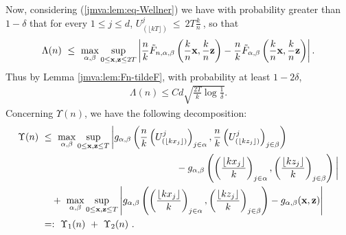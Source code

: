 Now, considering (\ref{jmva:lem:eq-Wellner}) we have with probability greater than $1-\delta$ that
for every $1\le j \le d$, $U_{(\lfloor kT\rfloor )}^j ~\le~ 2T \frac{k}{n}~$, so that
\begin{align*} 
\Lambda(n) %
  ~\le~ 
\max_{\alpha, \beta}  \sup_{0 \le \mb x, \mb z \le 2T} \left| \frac{n}{k} \tilde F_{n, \alpha, \beta} \left( \frac{k}{n} \mb x , \frac{k}{n} \mb z \right) - \frac{n}{k} \tilde F_{\alpha, \beta} \left( \frac{k}{n} \mb x , \frac{k}{n} \mb z \right)  \right|.
\end{align*}
\noindent
Thus by Lemma \ref{jmva:lem:Fn-tildeF}, with probability at least $1-2\delta$,
\begin{align*}
 \Lambda(n) \le C d\sqrt{\frac{2 T}{k}\log\frac{1}{\delta}}.
\end{align*}
\noindent
Concerning $\Upsilon(n)$, we have the following decomposition:
\begin{align*}
 \Upsilon(n) &~\le~ \max_{\alpha, \beta} \sup_{ 0 \le \mathbf x, \mathbf z \le T } \bigg| g_{\alpha, \beta} \left( \frac{n}{k} \left(U_{(\lfloor kx_j\rfloor)}^j\right)_{j \in \alpha} , \frac{n}{k}\left(U_{(\lfloor kz_j\rfloor)}^j\right)_{j \in \beta}  \right) 
\\&~~~~~~~~~~~~~~~~~~~~~~~~~~~~~~~~~~~~~~~~~~~- g_{\alpha, \beta} \left(  \left(\frac{\lfloor kx_j\rfloor }{k}\right)_{j \in \alpha},\left(\frac{\lfloor kz_j\rfloor }{k}\right)_{j \in \beta} \right) \bigg| 
\\&~~~ ~+~     \max_{\alpha, \beta} \sup_{ 0 \le \mathbf x, \mathbf z \le T }
\left| g_{\alpha, \beta} \left(  \left(\frac{\lfloor kx_j\rfloor }{k}\right)_{j \in \alpha},\left(\frac{\lfloor kz_j\rfloor }{k}\right)_{j \in \beta} \right)
-g_{\alpha, \beta}(\mathbf x, \mathbf z) \right| 
\\&~=:~ \Upsilon_1(n) ~+~ \Upsilon_2(n)~.
\end{align*}

